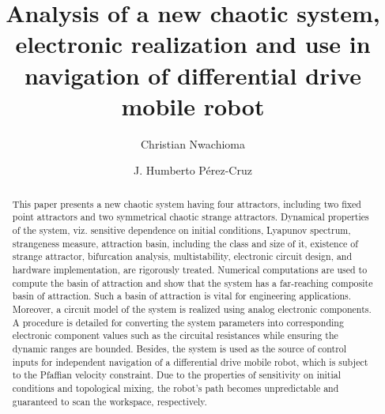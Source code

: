 \documentclass[final,5p,times,twocolumn]{elsarticle}
\begin{document}
\begin{frontmatter}



\title{Analysis of a new chaotic system, electronic realization and use in navigation of differential drive mobile robot}



\author[1,2]{Christian Nwachioma}
\author[2]{J. Humberto P\'erez-Cruz}
\address[1]{CIDETEC, Instituto Polit\'ecnico Nacional, Mexico City 07700, Mexico}
\address[2]{ESIME-Azc, Instituto Polit\'ecnico Nacional, Mexico City 02250, Mexico}

\begin{abstract}
This paper presents a new chaotic system having four attractors, including two fixed point attractors and two symmetrical chaotic strange attractors. Dynamical properties of the system, viz. sensitive dependence on initial conditions, Lyapunov spectrum, strangeness measure, attraction basin, including the class and size of it, existence of strange attractor, bifurcation analysis, multistability, electronic circuit design, and hardware implementation, are rigorously treated. Numerical computations are used to compute the basin of attraction and show that the system has a far-reaching composite basin of attraction. Such a basin of attraction is vital for engineering applications. Moreover, a circuit model of the system is realized using analog electronic components. A procedure is detailed for converting the system parameters into corresponding electronic component values such as the circuital resistances while ensuring the dynamic ranges are bounded. Besides, the system is used as the source of control inputs for independent navigation of a differential drive mobile robot, which is subject to the Pfaffian velocity constraint. Due to the properties of sensitivity on initial conditions and topological mixing, the robot's path becomes unpredictable and guaranteed to scan the workspace, respectively.
\end{abstract}


\end{frontmatter}
\end{document}
